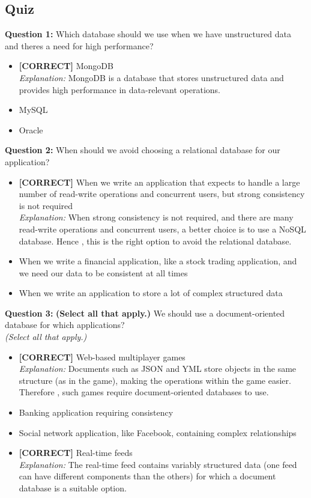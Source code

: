 \subsection*{Quiz}
\vspace{0.3cm}
\noindent
\textbf{Question 1:} Which database should we use when we have unstructured data and there\textquotesingle s a need for high performance?
\\[0.2cm]
\begin{itemize}
    \item \textbf{[CORRECT]} MongoDB
\\[0.1cm]
\textit{Explanation:} 
MongoDB is a database that stores unstructured data and provides high performance in data-relevant operations.
    \item MySQL
    \item Oracle
\end{itemize}
\vspace{0.3cm}
\noindent
\textbf{Question 2:} When should we avoid choosing a relational database for our application?
\\[0.2cm]
\begin{itemize}
    \item \textbf{[CORRECT]} When we write an application that expects to handle a large number of read-write operations and concurrent users, but strong consistency is not required
\\[0.1cm]
\textit{Explanation:} 
When strong consistency is not required, and there are many read-write operations and concurrent users, a better choice is to use a NoSQL database. Hence
, this is the right option to avoid the relational database.
    \item When we write a financial application, like a stock trading application, and we need our data to be consistent at all times
    \item When we write an application to store a lot of complex structured data
\end{itemize}
\vspace{0.3cm}
\noindent
\textbf{Question 3:} \textbf{(Select all that apply.)} We should use a document-oriented database for which applications?
\\
\textit{(Select all that apply.)}
\\[0.2cm]
\begin{itemize}
    \item \textbf{[CORRECT]} Web-based multiplayer games
\\[0.1cm]
\textit{Explanation:} 
Documents such as JSON and YML store objects in the same structure (as in the game), making the operations within the game easier. Therefore
, such games require document-oriented databases to use.
    \item Banking application requiring consistency
    \item Social network application, like Facebook, containing complex relationships
    \item \textbf{[CORRECT]} Real-time feeds
\\[0.1cm]
\textit{Explanation:} 
The real-time feed contains variably structured data (one feed can have different components than the others) for which a document database is a suitable option.
\end{itemize}